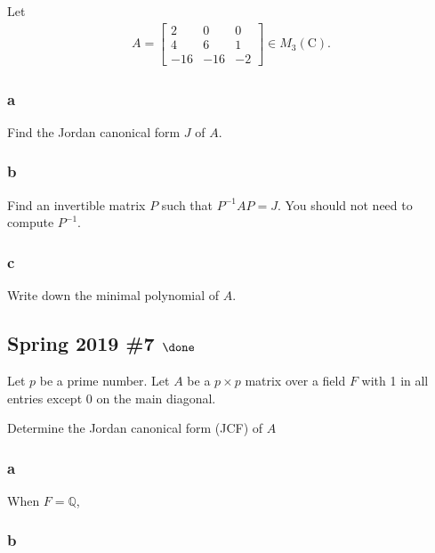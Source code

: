 Let
\begin{align*}
A=\left[\begin{array}{ccc}
2 & 0 & 0 \\
4 & 6 & 1 \\
-16 & -16 & -2
\end{array}\right] \in M_{3}(\mathrm{C})
.\end{align*}

\hypertarget{a-109}{%
\subsubsection{a}\label{a-109}}

Find the Jordan canonical form \(J\) of \(A\).

\hypertarget{b-99}{%
\subsubsection{b}\label{b-99}}

Find an invertible matrix \(P\) such that \(P^{-1}A P = J\). You should
not need to compute \(P^{-1}\).

\hypertarget{c-60}{%
\subsubsection{c}\label{c-60}}

Write down the minimal polynomial of \(A\).

\hypertarget{spring-2019-7-done}{%
\subsection{\texorpdfstring{Spring 2019 \#7
\(\done\)}{Spring 2019 \#7 \textbackslash done}}\label{spring-2019-7-done}}

Let \(p\) be a prime number. Let \(A\) be a \(p \times p\) matrix over a
field \(F\) with 1 in all entries except 0 on the main diagonal.

Determine the Jordan canonical form (JCF) of \(A\)

\hypertarget{a-110}{%
\subsubsection{a}\label{a-110}}

When \(F = {\mathbb{Q}}\),

\hypertarget{b-100}{%
\subsubsection{b}\label{b-100}}

